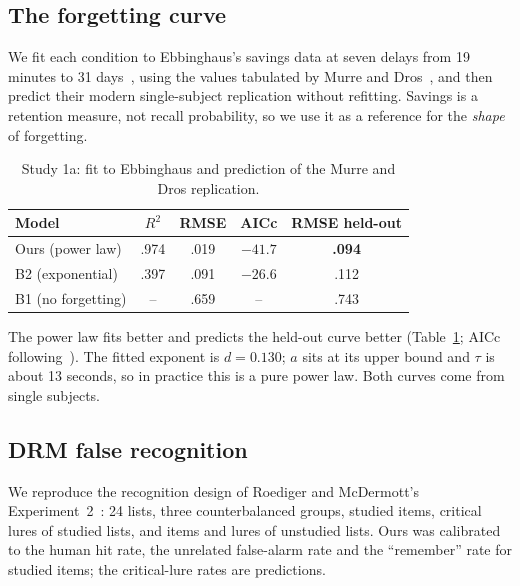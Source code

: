 \documentclass[conference]{IEEEtran}
\begin{document}
\subsection{The forgetting curve}
We fit each condition to Ebbinghaus's savings data at seven delays from 19 minutes to 31
days~\cite{ebbinghaus1885}, using the values tabulated by Murre and Dros~\cite{murre2015}, and then
predict their modern single-subject replication without refitting. Savings is a retention measure,
not recall probability, so we use it as a reference for the \emph{shape} of forgetting.

\begin{table}[t]
\centering
\caption{Study 1a: fit to Ebbinghaus and prediction of the Murre and Dros replication.}
\label{tab:exp1a}
\footnotesize
\begin{tabular}{lcccc}
\toprule
Model & $R^2$ & RMSE & AICc & RMSE held-out\\
\midrule
Ours (power law) & .974 & .019 & $-41.7$ & \textbf{.094}\\
B2 (exponential) & .397 & .091 & $-26.6$ & .112\\
B1 (no forgetting) & -- & .659 & -- & .743\\
\bottomrule
\end{tabular}
\end{table}

The power law fits better and predicts the held-out curve better (Table~\ref{tab:exp1a}; AICc
following~\cite{burnham2002}). The fitted exponent is $d = 0.130$; $a$ sits at its upper bound and
$\tau$ is about 13 seconds, so in practice this is a pure power law. Both curves come from single
subjects.

\subsection{DRM false recognition}
We reproduce the recognition design of Roediger and McDermott's Experiment~2~\cite{roediger1995}:
24 lists, three counterbalanced groups, studied items, critical lures of studied lists, and items and
lures of unstudied lists. Ours was calibrated to the human hit rate, the unrelated false-alarm rate and
the ``remember'' rate for studied items; the critical-lure rates are predictions.
\end{document}
